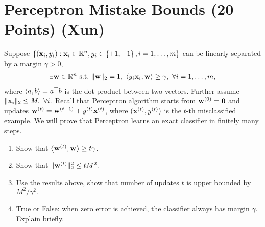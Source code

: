 \section{Perceptron Mistake Bounds (20 Points) (Xun)}

\newcommand{\tth}{^{(t)}}

Suppose $ \left\lbrace (\mathbf{x}_i, y_i): \mathbf{x}_i \in \mathbb{R}^n, y_i \in \left\lbrace +1, -1 \right\rbrace, i = 1,\dotsc,m \right\rbrace $ can be linearly separated by a margin $ \gamma > 0 $, 
\ie 
\begin{align}
\exists \mathbf{w} \in \mathbb{R}^n \ \mathrm{s.t.}\  \| \mathbf{w} \|_2 = 1, \ \left\langle y_i \mathbf{x}_i, \mathbf{w} \right\rangle \ge \gamma, \ \forall i = 1,\dotsc,m,
\end{align}
where $ \left\langle a,b \right\rangle = a^\top b $ is the dot product between two vectors. 
Further assume $ \| \mathbf{x}_i \|_2 \le M, \ \forall i $.
Recall that Perceptron algorithm starts from $ \mathbf{w}^{(0)} = \mathbf{0} $
and updates
$ \wv\tth = \wv^{(t-1)} + y\tth \xv\tth $, where $ (\xv\tth, y\tth) $ is the $ t $-th misclassified example.
We will prove that Perceptron learns an exact classifier in finitely many steps. 

\begin{enumerate}
\item Show that $ \inner{\wv\tth, \wv} \ge t \gamma $.

\item Show that $ \| \wv\tth \|_2^2 \le t M^2. $

\item Use the results above, show that number of updates $ t $ is upper bounded by  $ M^2 / \gamma^2. $

\item True or False: when zero error is achieved, the classifier always has margin $ \gamma $. 
Explain briefly. 

\end{enumerate}


